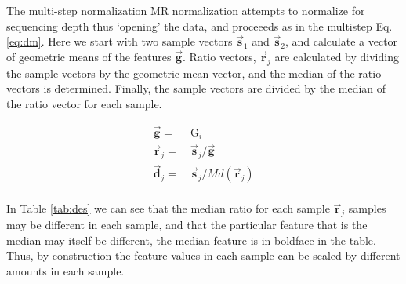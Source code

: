 \documentclass[twocolumn]{article}
\begin{document}
The multi-step normalization MR normalization attempts to normalize for
sequencing depth thus `opening' the data, and proceeeds as in the
multistep Eq. \ref{eq:dm}. Here we start with two sample vectors
\(\vec{\textbf{s}}_1\) and \(\vec{\textbf{s}}_2\), and calculate a
vector of geometric means of the features \(\vec{\textbf{g}}\). Ratio
vectors, \(\vec{\textbf{r}}_j\) are calculated by dividing the sample
vectors by the geometric mean vector, and the median of the ratio
vectors is determined. Finally, the sample vectors are divided by the
median of the ratio vector for each sample.

\begin{equation}
    \begin{aligned}
        \vec{\textbf{g}} = &\ \mathrm{G}_{i-}\\
        \vec{\textbf{r}}_j = &\ \vec{\textbf{s}}_j / \vec{\textbf{g}}\\
        \vec{\textbf{d}}_j = &\ \vec{\textbf{s}}_j / Md(\vec{\textbf{r}}_j)\\
    \end{aligned}
\label{eq:dm}
\end{equation}

In Table \ref{tab:des} we can see that the median ratio for each sample
\(\vec{\textbf{r}}_j\) samples may be different in each sample, and that
the particular feature that is the median may itself be different, the
median feature is in boldface in the table. Thus, by construction the
feature values in each sample can be scaled by different amounts in each
sample.

\begin{table}[!h]
\caption{Example calculation of DM normalization}
\centering
{}
\label{tab:des}
\end{table}
\end{document}
